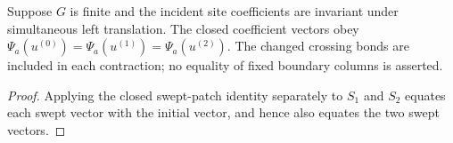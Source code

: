 \begin{lemma}%
    \label{thm:peps_torus_swept_string_state}
    \leanok
    Suppose $G$ is finite and the incident site coefficients are
    invariant under simultaneous left translation. The closed
    coefficient vectors obey
    $\Psi_a(u^{(0)})=\Psi_a(u^{(1)})=\Psi_a(u^{(2)})$.
    The changed crossing bonds are included in each contraction;
    no equality of fixed boundary columns is asserted.
\end{lemma}

\begin{proof}\leanok
    Applying the closed swept-patch identity separately to $S_1$ and $S_2$
    equates each swept vector with the initial vector, and hence also equates
    the two swept vectors.
\end{proof}
